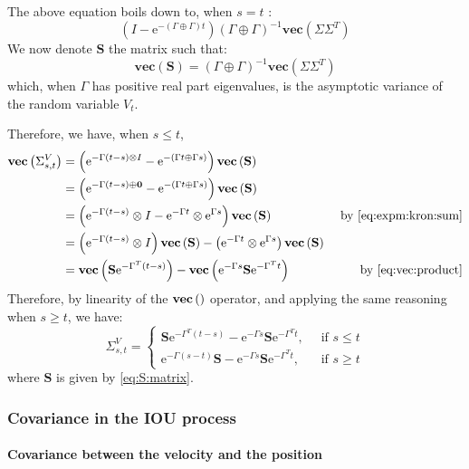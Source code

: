 \documentclass[10pt,a4paper]{article}
\newcommand{\e}{\text{e}}
\newcommand{\inv}{^{-1}}
\newcommand{\GpG}{\left( \Gamma \oplus \Gamma \right)}
\newcommand{\Vect}[1]{\textbf{vec}\left(#1 \right)}
\newcommand{\Sinf}{\mathbf{S}}
\begin{document}
The above equation boils down to,  when $s=t$ :
$$\left(I - \e^{-(\Gamma  \oplus \Gamma) t} \right) \GpG\inv\Vect{\Sigma \Sigma^T} $$
We now denote $\Sinf$ the matrix such that:
\begin{equation}
\Vect{\Sinf} = \GpG\inv\Vect{\Sigma \Sigma^T} \label{eq:S:matrix}
\end{equation}
which, when $\Gamma$ has positive real part eigenvalues, is the asymptotic variance of the random variable $V_t$.

Therefore, we have, when $s\leq t$,
\begin{align*}
\Vect{\Sigma_{s,t}^V} &= \left( \e^{- \Gamma(t-s) \otimes I } - \e^{-(\Gamma t \oplus \Gamma s)} \right) \Vect{\Sinf}& \\
&=\left( \e^{- \Gamma(t-s) \oplus \mathbf{0}} - \e^{-(\Gamma t \oplus \Gamma s)} \right) \Vect{\Sinf}&\\
&=\left( \e^{- \Gamma(t-s)} \otimes I - \e^{-\Gamma t} \otimes \e^{\Gamma s} \right) \Vect{\Sinf} & \text { by \eqref{eq:expm:kron:sum}}\\
&=\left( \e^{- \Gamma(t-s)} \otimes I\right)\Vect{\Sinf} - \left(\e^{-\Gamma t} \otimes \e^{\Gamma s} \right)\Vect{\Sinf}  & \\
&=\Vect{\Sinf\e^{-\Gamma^T (t - s)}} -\Vect{\e^{-\Gamma s}\Sinf \e^{-\Gamma^T t}} & \text{ by \eqref{eq:vec:product}}\\
\end{align*}
Therefore, by linearity of the $\Vect{\hbox{}}$ operator, and applying the same reasoning when $s\geq t$, we have:
\begin{equation}
\Sigma_{s,t}^V =  \left\lbrace \begin{array}{lr}
 \Sinf\e^{-\Gamma^T (t - s)} -\e^{-\Gamma s}\Sinf \e^{-\Gamma^T t},& ~\text{ if } s \leq t \\
 \e^{-\Gamma (s - t)}\Sinf -\e^{-\Gamma s}\Sinf \e^{-\Gamma^T t},&~\text{ if } s \geq t
\end{array}\right.
\label{eq:OU:cov:matrix}
\end{equation}
where $\Sinf$ is given by \eqref{eq:S:matrix}.

\subsubsection{Covariance in the IOU process}

\paragraph{Covariance between the velocity and the position}
\end{document}
